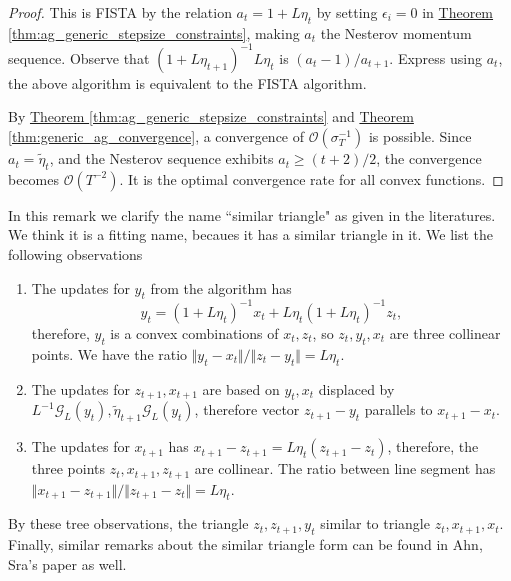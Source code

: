 \documentclass[12pt]{article}
\begin{document}
\begin{proof}
            This is FISTA by the relation $a_t = 1 + L\eta_t$ by setting $\epsilon_i = 0$ in
            \hyperref[thm:ag_generic_stepsize_constraints]
            {Theorem \ref*{thm:ag_generic_stepsize_constraints}}, 
            making $a_t$ the Nesterov momentum sequence. 
            Observe that $(1 + L\eta_{t + 1})^{-1}L\eta_t$ is $(a_t - 1)/a_{t + 1}$.
            Express using $a_t$, the above algorithm is equivalent to the FISTA algorithm. 
            \par
            By 
            \hyperref[thm:ag_generic_stepsize_constraints]{Theorem \ref*{thm:ag_generic_stepsize_constraints}}
            and 
            \hyperref[thm:generic_ag_convergence]{Theorem \ref*{thm:generic_ag_convergence}},
            a convergence of $\mathcal O(\sigma_T^{-1})$ is possible. 
            Since $a_t = \tilde \eta_t$, and the Nesterov sequence exhibits $a_{t} \ge (t + 2)/2$, the convergence becomes $\mathcal O(T^{-2})$. 
            It is the optimal convergence rate for all convex functions. 
        \end{proof}
        \begin{remark}
            In this remark we clarify the name ``similar triangle" as given in the literatures. 
            We think it is a fitting name, becaues it has a similar triangle in it. 
            We list the following observations
            \begin{enumerate}
                \item 
                The updates for $y_{t}$ from the algorithm has 
                $$
                    y_t = (1 + L\eta_t)^{-1} x_t + L\eta_t(1 + L\eta_t)^{-1} z_t, 
                $$
                therefore, $y_t$ is a convex combinations of $x_t, z_t$, so $z_t, y_t, x_t$ are three collinear points. 
                We have the ratio $\Vert y_t - x_t\Vert/\Vert z_t - y_t\Vert = L\eta_t$. 
                \item 
                The updates for $z_{t + 1}, x_{t + 1}$ are based on $y_t, x_t$ displaced by $L^{-1} \mathcal G_L(y_t), \tilde\eta_{t +1} \mathcal G_L(y_t)$, therefore vector $z_{t + 1} - y_t$ parallels to $x_{t + 1} - x_t$. 
                \item The updates for $x_{t + 1}$ has $x_{t + 1} - z_{t + 1} = L\eta_t \left(z_{t + 1} - z_t\right)$, therefore, the three points $z_t, x_{t + 1}, z_{t + 1}$ are collinear. 
                The ratio between line segment has $\Vert x_{t + 1} - z_{t + 1}\Vert/\Vert z_{t + 1} - z_t\Vert = L\eta_t$. 
            \end{enumerate}
            By these tree observations, the triangle $z_{t}, z_{t + 1}, y_t$ similar to triangle $z_t, x_{t + 1}, x_t$. 
            Finally, similar remarks about the similar triangle form can be found in Ahn, Sra's paper \cite{ahn_understanding_2022} as well. 
        \end{remark} 
        
\end{document}
